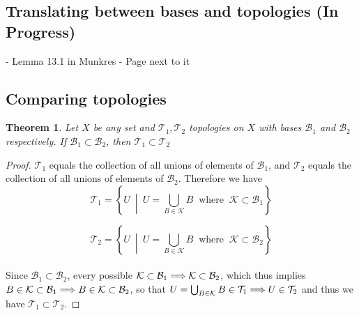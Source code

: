 \documentclass{article}
\newtheorem{theorem}{Theorem}[section]
\theoremstyle{remark}
\theoremstyle{definition}
\newcommand{\simplies}{\DOTSB\Longrightarrow}
\begin{document}
\newpage

\subsection{Translating between bases and topologies (In Progress)}

- Lemma 13.1 in Munkres
- Page next to it

\newpage

\subsection{Comparing topologies}

\bigskip

\begin{theorem}
Let $X$ be any set and $\mathcal{T}_1, \mathcal{T}_2$ topologies on $X$ with bases $\mathcal{B}_1$ and $\mathcal{B}_2$ respectively. If $\mathcal{B}_1 \subset \mathcal{B}_2$, then $\mathcal{T}_1 \subset \mathcal{T}_2$
\end{theorem}

\begin{proof}
$\mathcal{T}_1$ equals the collection of all unions of elements of $\mathcal{B}_1$, and $\mathcal{T}_2$ equals the collection of all unions of elements of $\mathcal{B}_2$. Therefore we have
 $$\mathcal{T}_1 = \left\{U \ \middle| \ U = \bigcup_{B \in \mathcal{K}}B \ \text{ where } \ \mathcal{K} \subset \mathcal{B}_1\right\}$$

$$\mathcal{T}_2 = \left\{U \ \middle| \ U = \bigcup_{B \in \mathcal{K}}B \ \text{ where } \ \mathcal{K} \subset \mathcal{B}_2\right\}$$
\\
Since $\mathcal{B}_1 \subset \mathcal{B}_2$, every possible $\mathcal{K} \subset \mathcal{B}_1 \simplies \mathcal{K} \subset \mathcal{B}_2$, which thus implies $B \in \mathcal{K} \subset \mathcal{B}_1 \simplies B \in\mathcal{K} \subset \mathcal{B}_2$, so that $U = \bigcup_{B \in \mathcal{K}}B \in \mathcal{T}_1 \simplies U \in \mathcal{T}_2$ and thus we have $\mathcal{T}_1 \subset \mathcal{T}_2$.
\end{proof}
\end{document}
